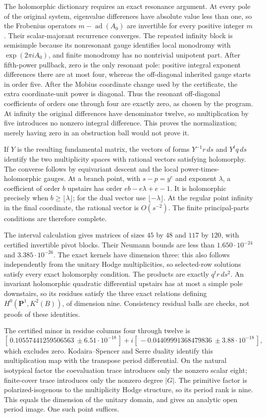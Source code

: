 \documentclass[11pt]{article}
\theoremstyle{definition}
\theoremstyle{remark}
\begin{document}
The holomorphic dictionary requires an exact resonance argument.
At every pole of the original system, eigenvalue differences have
absolute value less than one, so the Frobenius operators
$m-\operatorname{ad}(A_0)$ are invertible for every positive integer
$m$.  Their scalar-majorant recurrence converges.
The repeated infinity block is semisimple because its nonresonant
gauge identifies local monodromy with $\exp(2\pi i A_0)$, and finite
monodromy has no nontrivial unipotent part.
After fifth-power pullback, zero is the only resonant pole:
positive integral exponent differences there are at most four,
whereas the off-diagonal inherited gauge starts in order five.
After the Mobius coordinate change used by the certificate, the extra
coordinate-unit power is diagonal.
Thus the resonant off-diagonal coefficients of orders one through four
are exactly zero, as chosen by the program.
At infinity the original differences have denominator twelve, so
multiplication by five introduces no nonzero integral difference.
This proves the normalization; merely having zero in an obstruction
ball would not prove it.

If $Y$ is the resulting fundamental matrix, the vectors of forms
$Y^{-1}r\,ds$ and $Y^tq\,ds$ identify the two multiplicity spaces with
rational vectors satisfying holomorphy.
The converse follows by equivariant descent and the local
power-times-holomorphic gauges.
At a branch point, with $s-p=y^e$ and exponent $\lambda$, a coefficient
of order $b$ upstairs has order $eb-e\lambda+e-1$.
It is holomorphic precisely when $b\ge\lfloor\lambda\rfloor$;
for the dual vector use $\lfloor-\lambda\rfloor$.
At the regular point infinity in the final coordinate, the rational
vector is $O(s^{-2})$.
The finite principal-parts conditions are therefore complete.

The interval calculation gives matrices of sizes $45$ by $48$ and
$117$ by $120$, with certified invertible pivot blocks.
Their Neumann bounds are less than $1.650\cdot10^{-24}$ and
$3.385\cdot10^{-26}$.
The exact kernels have dimension three: this also follows independently
from the unitary Hodge multiplicities, so selected-row solutions
satisfy every exact holomorphy condition.
The products are exactly $q^tr\,ds^2$.
An invariant holomorphic quadratic differential upstairs has at most a
simple pole downstairs, so its residues satisfy the three exact
relations defining $H^0(\mathbf P^1,K^2(B))$, of dimension nine.
Consistency residual balls are checks, not proofs of these identities.

The certified minor in residue columns four through twelve is
\[
 [\,0.10557441259506563\ \pm6.51\cdot10^{-18}\,]
 +i[\,-0.04409991368479836\ \pm3.88\cdot10^{-18}\,],
\]
which excludes zero.
Kodaira--Spencer and Serre duality identify this multiplication map
with the transpose period differential.
On the natural isotypical factor the coevaluation trace introduces
only the nonzero scalar eight; finite-cover trace introduces only the
nonzero degree $|G|$.
The primitive factor is polarized-isogenous to the multiplicity
Hodge structure, so its period rank is nine.
This equals the dimension of the unitary domain, and gives an analytic
open period image.  One such point suffices.
\end{document}
